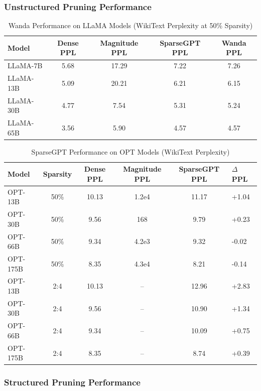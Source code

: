 \subsubsection{Unstructured Pruning Performance}

\begin{table}[H]
	\centering
	\caption{Wanda Performance on LLaMA Models (WikiText Perplexity at 50\% Sparsity)}
	\label{tab:wanda_results}
	\begin{tabular}{@{}lcccc@{}}
		\toprule
		\textbf{Model} & \textbf{Dense PPL} & \textbf{Magnitude PPL} & \textbf{SparseGPT PPL} & \textbf{Wanda PPL} \\ \midrule
		LLaMA-7B  & 5.68 & 17.29 & 7.22 & 7.26 \\
		LLaMA-13B & 5.09 & 20.21 & 6.21 & 6.15 \\
		LLaMA-30B & 4.77 & 7.54  & 5.31 & 5.24 \\
		LLaMA-65B & 3.56 & 5.90  & 4.57 & 4.57 \\
		\bottomrule
	\end{tabular}
\end{table}

\begin{table}[H]
	\centering
	\caption{SparseGPT Performance on OPT Models (WikiText Perplexity)}
	\label{tab:sparsegpt_results}
	\begin{tabular}{@{}lccccl@{}}
		\toprule
		\textbf{Model} & \textbf{Sparsity} & \textbf{Dense PPL} & \textbf{Magnitude PPL} & \textbf{SparseGPT PPL} & \textbf{$\Delta$ PPL} \\ \midrule
		OPT-13B  & 50\% & 10.13 & 1.2e4 & 11.17 & +1.04 \\
		OPT-30B  & 50\% & 9.56  & 168   & 9.79  & +0.23 \\
		OPT-66B  & 50\% & 9.34  & 4.2e3 & 9.32  & -0.02 \\
		OPT-175B & 50\% & 8.35  & 4.3e4 & 8.21  & -0.14 \\ \midrule
		OPT-13B  & 2:4  & 10.13 & --    & 12.96 & +2.83 \\
		OPT-30B  & 2:4  & 9.56  & --    & 10.90 & +1.34 \\
		OPT-66B  & 2:4  & 9.34  & --    & 10.09 & +0.75 \\
		OPT-175B & 2:4  & 8.35  & --    & 8.74  & +0.39 \\ \bottomrule
	\end{tabular}
\end{table}

\subsubsection{Structured Pruning Performance}

